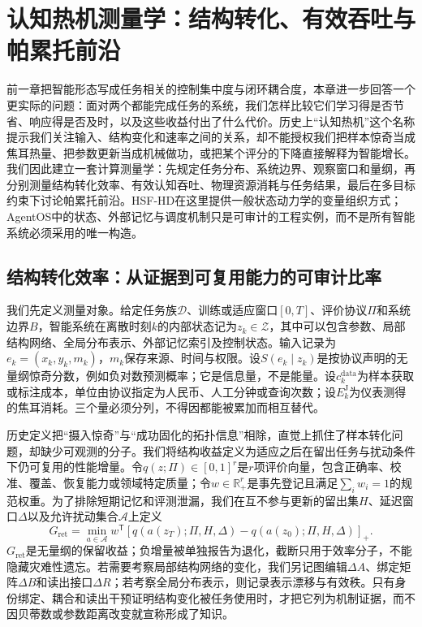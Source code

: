 \chapter{认知热机测量学：结构转化、有效吞吐与帕累托前沿}
\label{chp:cognitive_heat_engine_metrics}

前一章把智能形态写成任务相关的控制集中度与闭环耦合度，本章进一步回答一个更实际的问题：面对两个都能完成任务的系统，我们怎样比较它们学习得是否节省、响应得是否及时，以及这些收益付出了什么代价。历史上“认知热机”这个名称提示我们关注输入、结构变化和速率之间的关系，却不能授权我们把样本惊奇当成焦耳热量、把参数更新当成机械做功，或把某个评分的下降直接解释为智能增长。我们因此建立一套计算测量学：先规定任务分布、系统边界、观察窗口和量纲，再分别测量结构转化效率、有效认知吞吐、物理资源消耗与任务结果，最后在多目标约束下讨论帕累托前沿。HSF-HD在这里提供一般状态动力学的变量组织方式；AgentOS中的状态、外部记忆与调度机制只是可审计的工程实例，而不是所有智能系统必须采用的唯一构造。

\section{结构转化效率：从证据到可复用能力的可审计比率}
\label{sec:cognitive_efficiency}

我们先定义测量对象。给定任务族$\mathcal{D}$、训练或适应窗口$[0,T]$、评价协议$\Pi$和系统边界$B$，智能系统在离散时刻$k$的内部状态记为$z_k\in\mathcal{Z}$，其中可以包含参数、局部结构网络、全局分布表示、外部记忆索引及控制状态。输入记录为$e_k=(x_k,y_k,m_k)$，$m_k$保存来源、时间与权限。设$S(e_k\mid z_k)$是按协议声明的无量纲惊奇分数，例如负对数预测概率；它是信息量，不是能量。设$c_k^{\mathrm{data}}$为样本获取或标注成本，单位由协议指定为人民币、人工分钟或查询次数；设$E_k^{\mathrm{J}}$为仪表测得的焦耳消耗。三个量必须分列，不得因都能被累加而相互替代。

历史定义把“摄入惊奇”与“成功固化的拓扑信息”相除，直觉上抓住了样本转化问题，却缺少可观测的分子。我们将结构收益定义为适应之后在留出任务与扰动条件下仍可复用的性能增量。令$q(z;\Pi)\in[0,1]^r$是$r$项评价向量，包含正确率、校准、覆盖、恢复能力或领域特定质量；令$w\in\mathbb{R}_{+}^{r}$是事先登记且满足$\sum_iw_i=1$的规范权重。为了排除短期记忆和评测泄漏，我们在互不参与更新的留出集$H$、延迟窗口$\Delta$以及允许扰动集合$\mathcal{A}$上定义
\begin{equation}
G_{\mathrm{ret}}=\min_{a\in\mathcal{A}}w^{\mathsf T}\!\left[q\!\left(a(z_T);\Pi,H,\Delta\right)-q\!\left(a(z_0);\Pi,H,\Delta\right)\right]_{+}.
\end{equation}
$G_{\mathrm{ret}}$是无量纲的保留收益；负增量被单独报告为退化，截断只用于效率分子，不能隐藏灾难性遗忘。若需要考察局部结构网络的变化，我们另记图编辑$\Delta A$、绑定矩阵$\Delta B$和读出接口$\Delta R$；若考察全局分布表示，则记录表示漂移与有效秩。只有身份绑定、耦合和读出干预证明结构变化被任务使用时，才把它列为机制证据，而不因贝蒂数或参数距离改变就宣称形成了知识。


